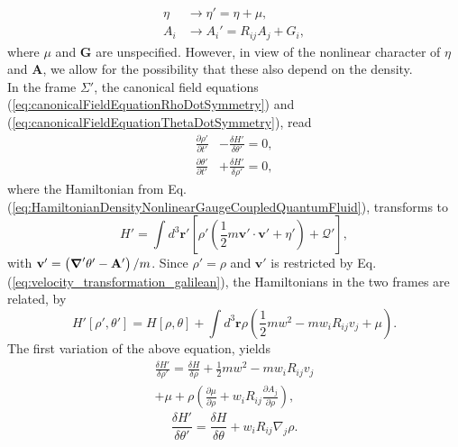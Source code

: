\documentclass[twocolumn, nofootinbib, nobibnotes, amsmath,amssymb,aps, pra, floatfix]{revtex4-1}
\renewcommand{\v}[1]{\ensuremath{\mathbf{#1}}} %
\newcommand{\gv}[1]{\ensuremath{\mbox{\boldmath$ #1 $}}} %
\newcommand{\pd}[2]{\frac{\partial #1}{\partial #2}} %
\newcommand{\grad}[1]{\gv{\nabla} #1} %
\begin{document}
\begin{align}
    \eta&\rightarrow\eta'=\eta+\mu, \label{eq:scalarPotentialTransformationNonlinearGalileanTransformation} \\
    A_i&\rightarrow A_i'=R_{ij}A_j+G_i, \label{eq:vectorPotentialTransformationNonlinearGalileanTransformation}
\end{align}
where $\mu$ and $\v{G}$ are unspecified.
However, in view of the nonlinear character of $\eta$ and $\v{A}$, we allow for the possibility that these also depend on the density.\\
In the frame $\Sigma'$, the canonical field equations (\ref{eq:canonicalFieldEquationRhoDotSymmetry}) and (\ref{eq:canonicalFieldEquationThetaDotSymmetry}), read
\begin{align}
  \pd{\rho'}{t'}&-\frac{\delta H'}{\delta\theta'}=0, \label{eq:canonicalFieldEquationRhoDotGalileanTransformed} \\
  \pd{\theta'}{t'}&+\frac{\delta H'}{\delta\rho'}=0, \label{eq:canonicalFieldEquationThetaDotGalileanTransformed}
\end{align}
where the Hamiltonian from Eq. (\ref{eq:HamiltonianDensityNonlinearGaugeCoupledQuantumFluid}), transforms to
\begin{equation}
  H'=\int d^3\v{r}'\left[ \rho'\left( \frac{1}{2}m\v{v}'\cdot\v{v}'+\eta'\right)+\mathcal{Q}' \right],
  \label{eq:HamiltonianGalileanTransformedExternalGeneric}
\end{equation}
with $\v{v}'=\left(\grad'\theta'-\v{A}'\right)/m$. 
Since $\rho'=\rho$ and $\v{v}'$ is restricted by Eq. (\ref{eq:velocity_transformation_galilean}), the Hamiltonians in the two frames are related, by
\begin{equation}
    H'\left[ \rho',\theta' \right]=H\left[ \rho,\theta \right]+\int d^3\v{r}\rho\left( \frac{1}{2}mw^2-mw_iR_{ij}v_j+\mu \right).
  \label{eq:HamiltonianGalileanTransformedExternal}
\end{equation}
The first variation of the above equation, yields
\begin{multline}
    \frac{\delta H'}{\delta\rho'}= \frac{\delta H}{\delta\rho}+\frac{1}{2}mw^2-mw_iR_{ij}v_j\\+\mu+\rho\left( \pd{\mu}{\rho}+w_iR_{ij}\pd{A_j}{\rho} \right), \label{eq:variationalDerivativeHamiltonianRelationRhoGalileanNonlinearField}
\end{multline}
\begin{equation}
  \frac{\delta H'}{\delta\theta'}= \frac{\delta H}{\delta\theta}+w_iR_{ij}\nabla_j\rho.\label{eq:variationalDerivativeHamiltonianRelationThetaGalileanNonlinearField}
\end{equation}
\end{document}
